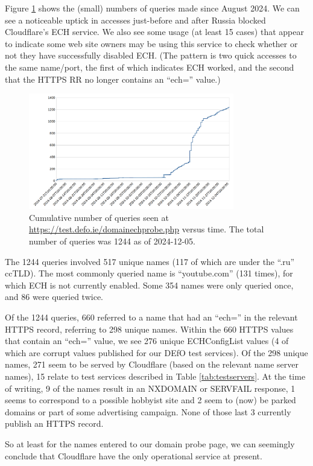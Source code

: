 Figure \ref{fig:qtimes} shows the (small) numbers of queries made since August
2024. We can see a noticeable uptick in accesses just-before and after Russia
blocked Cloudflare's ECH service. We also see some usage (at least 15 cases) that
appear to indicate some web site owners may be using this service to check
whether or not they have successfully disabled ECH. (The pattern is two quick
accesses to the same name/port, the first of which indicates ECH worked, and
the second that the HTTPS RR no longer contains an ``ech='' value.)

\begin{figure}
	\centering
	\includegraphics[width=0.8\textwidth,keepaspectratio]{domainprobequeries.png}
		\caption[clustediag]{Cumulative number of queries seen at 
        \url{https://test.defo.ie/domainechprobe.php} versus time. 
        The total number of queries was 1244 as of 2024-12-05.} 
	\label{fig:qtimes}
\end{figure}

The 1244 queries involved 517 unique names (117 of which are under
the ``.ru'' ccTLD). The most commonly queried name is ``youtube.com'' (131 times),
for which ECH is not currently enabled. Some 354 names were only queried 
once, and 86 were queried twice.

Of the 1244 queries, 660 referred to a name that had an ``ech='' in
the relevant HTTPS record, referring to 298 unique names.  Within the 660 HTTPS 
values that contain an ``ech='' value, we see 276 unique ECHConfigList values (4 of which are
corrupt values published for our DEfO test services).  Of the 298 unique
names, 271 seem to be served by Cloudflare (based on the relevant name server
names), 15 relate to test services described in Table \ref{tab:testservers}. At
the time of writing, 9 of the names result in an NXDOMAIN or SERVFAIL
response, 1 seems to correspond to a possible hobbyist site and 2 seem to (now)
be parked domains or part of some advertising campaign. None of those last
3 currently publish an HTTPS record.

So at least for the names entered to our domain probe page, we can seemingly
conclude that Cloudflare have the only operational service at present.
